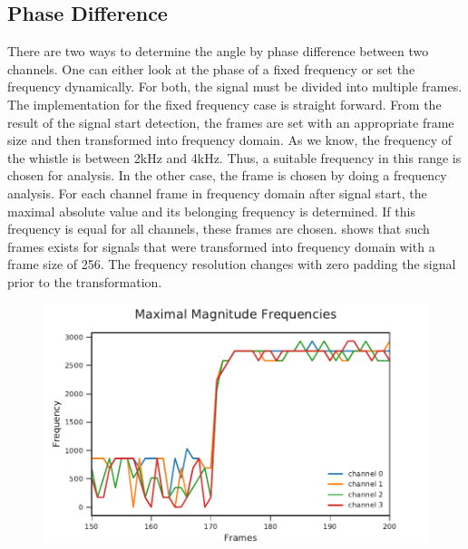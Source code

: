 \subsection*{Phase Difference}
\label{subsec:03_phase}

There are two ways to determine the angle by phase difference
between two channels.
One can either look at the phase of a fixed frequency or set the frequency
dynamically.
For both, the signal must be divided into multiple frames.
The implementation for the fixed frequency case is straight forward.
From the result of the signal start detection, the frames
are set with an appropriate frame size and then transformed into
frequency domain.
As we know, the frequency of the whistle is between 2\si{\kilo\hertz}
and 4\si{\kilo\hertz}.
Thus, a suitable frequency in this range is chosen for analysis.
In the other case, the frame is chosen by doing a
frequency analysis.
For each channel frame in frequency domain after signal start,
the maximal absolute value and its belonging frequency is determined.
If this frequency is equal for all channels, these frames
are chosen.
 shows that such frames exists for signals that
were transformed into frequency domain with a frame size of 256.
The frequency resolution changes with zero padding the signal prior
to the transformation.
\begin{figure}[ht]
	\centering
		\includegraphics[]{figures/maxFreq}
	\caption{}
    \label{fig:03_maxFreq}
\end{figure}

